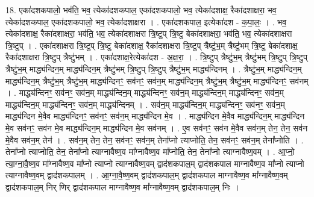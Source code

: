 \documentclass[17pt]{extarticle}
\begin{document}
18. एका॑दशकपालो॒ भव॑ति॒ भव॒ त्येका॑दशकपाल॒ एका॑दशकपालो॒ भव॒ त्येका॑दशाक्ष॒ रैका॑दशाक्षरा॒ भव॒ त्येका॑दशकपाल॒ एका॑दशकपालो॒ भव॒ त्येका॑दशाक्षरा । . एका॑दशकपाल॒ इत्येका॑दश - क॒पा॒लः॒ । . भव॒ त्येका॑दशाक्ष॒ रैका॑दशाक्षरा॒ भव॑ति॒ भव॒ त्येका॑दशाक्षरा त्रि॒ष्टुप् त्रि॒ष्टु बेका॑दशाक्षरा॒ भव॑ति॒ भव॒ त्येका॑दशाक्षरा त्रि॒ष्टुप् । . एका॑दशाक्षरा त्रि॒ष्टुप् त्रि॒ष्टु बेका॑दशाक्ष॒ रैका॑दशाक्षरा त्रि॒ष्टुप् त्रैष्टु॑भ॒म् त्रैष्टु॑भम् त्रि॒ष्टु बेका॑दशाक्ष॒ रैका॑दशाक्षरा त्रि॒ष्टुप् त्रैष्टु॑भम् । . एका॑दशाक्ष॒रेत्येका॑दश - अ॒क्ष॒रा॒ । . त्रि॒ष्टुप् त्रैष्टु॑भ॒म् त्रैष्टु॑भम् त्रि॒ष्टुप् त्रि॒ष्टुप् त्रैष्टु॑भ॒म् माद्ध्य॑न्दिन॒म् माद्ध्य॑न्दिन॒म् त्रैष्टु॑भम् त्रि॒ष्टुप् त्रि॒ष्टुप् त्रैष्टु॑भ॒म् माद्ध्य॑न्दिनम् । . त्रैष्टु॑भ॒म् माद्ध्य॑न्दिन॒म् माद्ध्य॑न्दिन॒म् त्रैष्टु॑भ॒म् त्रैष्टु॑भ॒म् माद्ध्य॑न्दिनꣳ॒॒ सव॑नꣳ॒॒ सव॑न॒म् माद्ध्य॑न्दिन॒म् त्रैष्टु॑भ॒म् त्रैष्टु॑भ॒म् माद्ध्य॑न्दिनꣳ॒॒ सव॑नम् । . माद्ध्य॑न्दिनꣳ॒॒ सव॑नꣳ॒॒ सव॑न॒म् माद्ध्य॑न्दिन॒म् माद्ध्य॑न्दिनꣳ॒॒ सव॑न॒म् माद्ध्य॑न्दिन॒म् माद्ध्य॑न्दिनꣳ॒॒ सव॑न॒म् माद्ध्य॑न्दिन॒म् माद्ध्य॑न्दिनꣳ॒॒ सव॑न॒म् माद्ध्य॑न्दिनम् । . सव॑न॒म् माद्ध्य॑न्दिन॒म् माद्ध्य॑न्दिनꣳ॒॒ सव॑नꣳ॒॒ सव॑न॒म् माद्ध्य॑न्दिन मे॒वैव माद्ध्य॑न्दिनꣳ॒॒ सव॑नꣳ॒॒ सव॑न॒म् माद्ध्य॑न्दिन मे॒व । . माद्ध्य॑न्दिन मे॒वैव माद्ध्य॑न्दिन॒म् माद्ध्य॑न्दिन मे॒व सव॑नꣳ॒॒ सव॑न मे॒व माद्ध्य॑न्दिन॒म् माद्ध्य॑न्दिन मे॒व सव॑नम् । . ए॒व सव॑नꣳ॒॒ सव॑न मे॒वैव सव॑न॒म् तेन॒ तेन॒ सव॑न मे॒वैव सव॑न॒म् तेन॑ । . सव॑न॒म् तेन॒ तेन॒ सव॑नꣳ॒॒ सव॑न॒म् तेना᳚प्नो त्याप्नोति॒ तेन॒ सव॑नꣳ॒॒ सव॑न॒म् तेना᳚प्नोति । . तेना᳚प्नो त्याप्नोति॒ तेन॒ तेना᳚प्नो त्याग्नावैष्ण॒व मा᳚ग्नावैष्ण॒व मा᳚प्नोति॒ तेन॒ तेना᳚प्नो त्याग्नावैष्ण॒वम् । . आ॒प्नो॒ त्या॒ग्ना॒वै॒ष्ण॒व मा᳚ग्नावैष्ण॒व मा᳚प्नो त्याप्नो त्याग्नावैष्ण॒वम् द्वाद॑शकपाल॒म् द्वाद॑शकपाल माग्नावैष्ण॒व मा᳚प्नो त्याप्नो त्याग्नावैष्ण॒वम् द्वाद॑शकपालम् । . आ॒ग्ना॒वै॒ष्ण॒वम् द्वाद॑शकपाल॒म् द्वाद॑शकपाल माग्नावैष्ण॒व मा᳚ग्नावैष्ण॒वम् द्वाद॑शकपाल॒म् निर् णिर् द्वाद॑शकपाल माग्नावैष्ण॒व मा᳚ग्नावैष्ण॒वम् द्वाद॑शकपाल॒म् निः । \newline
\end{document}
